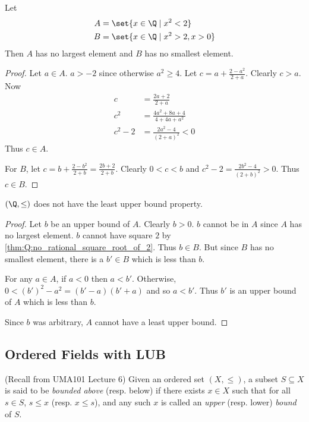 \begin{theorem} \label{thm:Q:root2_approximation}
    Let \begin{align*}
        A &= \set{x \in \Q \mid x^2 < 2} \\
        B &= \set{x \in \Q \mid x^2 > 2, x > 0}
    \end{align*}
    Then $A$ has no largest element and $B$ has no smallest element.
\end{theorem}
\begin{proof}
    Let $a \in A$.
    $a > -2$ since otherwise $a^2 \ge 4$.
    Let $c = a + \frac{2 - a^2}{2 + a}$.
    Clearly $c > a$.
    Now \begin{align*}
        c      &= \frac{2a + 2}{2 + a} \\
        c^2     &= \frac{4a^2 + 8a + 4}{4 + 4a + a^2} \\
        c^2 - 2 &= \frac{2a^2 - 4}{(2 + a)^2} < 0
    \end{align*}
    Thus $c \in A$.

    For $B$, let $c = b + \frac{2 - b^2}{2 + b} = \frac{2b + 2}{2 + b}$.
    Clearly $0 < c < b$ and $c^2 - 2 = \frac{2b^2 - 4}{(2 + b)^2} > 0$.
    Thus $c \in B$.
\end{proof}

\begin{corollary} \label{thm:Q:no_lub}
    $(\Q, \le)$ does not have the least upper bound property.
\end{corollary}
\begin{proof}
    Let $b$ be an upper bound of $A$.
    Clearly $b > 0$.
    $b$ cannot be in $A$ since $A$ has no largest element.
    $b$ cannot have square $2$ by \cref{thm:Q:no_rational_square_root_of_2}.
    Thus $b \in B$.
    But since $B$ has no smallest element, there is a $b' \in B$ which is less
    than $b$.

    For any $a \in A$, if $a < 0$ then $a < b'$.
    Otherwise, $0 < (b')^2 - a^2 = (b' - a)(b' + a)$ and so $a < b'$.
    Thus $b'$ is an upper bound of $A$ which is less than $b$.

    Since $b$ was arbitrary, $A$ cannot have a least upper bound.
\end{proof}

\subsection{Ordered Fields with LUB} \label{sec:ordered_fields_with_lub}
(Recall from UMA101 Lecture 6)
Given an ordered set $(X, \le)$, a subset $S \subseteq X$ is said to be
\emph{bounded above} (resp. below) if there exists $x \in X$ such that for all
$s \in S$, $s \le x$ (resp. $x \le s$), and any such $x$ is called an
\emph{upper} (resp. lower) \emph{bound} of $S$.

